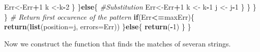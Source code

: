 \documentclass[]{article}
\newenvironment{Shaded}{\begin{snugshade}}{\end{snugshade}}
\newcommand{\KeywordTok}[1]{\textcolor[rgb]{0.13,0.29,0.53}{\textbf{#1}}}
\newcommand{\DataTypeTok}[1]{\textcolor[rgb]{0.13,0.29,0.53}{#1}}
\newcommand{\DecValTok}[1]{\textcolor[rgb]{0.00,0.00,0.81}{#1}}
\newcommand{\StringTok}[1]{\textcolor[rgb]{0.31,0.60,0.02}{#1}}
\newcommand{\CommentTok}[1]{\textcolor[rgb]{0.56,0.35,0.01}{\textit{#1}}}
\newcommand{\ControlFlowTok}[1]{\textcolor[rgb]{0.13,0.29,0.53}{\textbf{#1}}}
\newcommand{\OperatorTok}[1]{\textcolor[rgb]{0.81,0.36,0.00}{\textbf{#1}}}
\newcommand{\NormalTok}[1]{#1}
\begin{document}
\begin{Shaded}
\begin{Highlighting}[]
\NormalTok{            Err<-Err}\OperatorTok{+}\DecValTok{1}
\NormalTok{            k <-k}\OperatorTok{-}\DecValTok{2}
\NormalTok{          \}}
\NormalTok{        \}}\ControlFlowTok{else}\NormalTok{\{}
          \CommentTok{#Substitution}
\NormalTok{          Err<-Err}\OperatorTok{+}\DecValTok{1}
\NormalTok{          k <-}\StringTok{ }\NormalTok{k}\OperatorTok{-}\DecValTok{1}
\NormalTok{          j <-}\StringTok{ }\NormalTok{j}\OperatorTok{-}\DecValTok{1}
\NormalTok{        \}}
\NormalTok{      \}}
\NormalTok{    \}}
\NormalTok{  \}}
  \CommentTok{# Return first occurence of the pattern}
  \ControlFlowTok{if}\NormalTok{(Err}\OperatorTok{<=}\NormalTok{maxErr)\{}
    \KeywordTok{return}\NormalTok{(}\KeywordTok{list}\NormalTok{(}\DataTypeTok{position=}\NormalTok{j, }\DataTypeTok{errors=}\NormalTok{Err))}
\NormalTok{  \}}\ControlFlowTok{else}\NormalTok{\{}
    \KeywordTok{return}\NormalTok{(}\OperatorTok{-}\DecValTok{1}\NormalTok{)}
\NormalTok{  \}}
\NormalTok{\}}
\end{Highlighting}
\end{Shaded}

Now we construct the function that finds the matches of severan strings.
\end{document}

